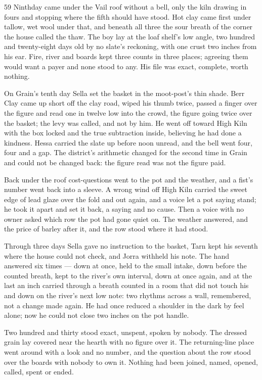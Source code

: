 \begin{CRchronicle}{59}
Ninthday came under the Vail roof without a bell, only the kiln drawing in fours and stopping where the fifth should have stood. Hot clay came first under tallow, wet wool under that, and beneath all three the sour breath of the corner the house called the thaw. The boy lay at the loaf shelf’s low angle, two hundred and twenty-eight days old by no slate’s reckoning, with one crust two inches from his ear. Fire, river and boards kept three counts in three places; agreeing them would want a payer and none stood to any. His file was exact, complete, worth nothing.

On Grain’s tenth day Sella set the basket in the moot-post’s thin shade. Berr Clay came up short off the clay road, wiped his thumb twice, passed a finger over the figure and read one in twelve low into the crowd, the figure going twice over the basket; the levy was called, and not by him. He went off toward High Kiln with the box locked and the true subtraction inside, believing he had done a kindness. Hessa carried the slate up before noon unread, and the bell went four, four and a gap. The district’s arithmetic changed for the second time in Grain and could not be changed back: the figure read was not the figure paid.

Back under the roof cost-questions went to the pot and the weather, and a fist’s number went back into a sleeve. A wrong wind off High Kiln carried the sweet edge of lead glaze over the fold and out again, and a voice let a pot saying stand; he took it apart and set it back, a saying and no cause. Then a voice with no owner asked which row the pot had gone quiet on. The weather answered, and the price of barley after it, and the row stood where it had stood.

Through three days Sella gave no instruction to the basket, Tarn kept his seventh where the house could not check, and Jorra withheld his note. The hand answered six times --- down at once, held to the small intake, down before the counted breath, kept to the river’s own interval, down at once again, and at the last an inch carried through a breath counted in a room that did not touch his and down on the river’s next low note: two rhythms across a wall, remembered, not a change made again. He had once reduced a shoulder in the dark by feel alone; now he could not close two inches on the pot handle.

Two hundred and thirty stood exact, unspent, spoken by nobody. The dressed grain lay covered near the hearth with no figure over it. The returning-line place went around with a look and no number, and the question about the row stood over the boards with nobody to own it. Nothing had been joined, named, opened, called, spent or ended.
\end{CRchronicle}
